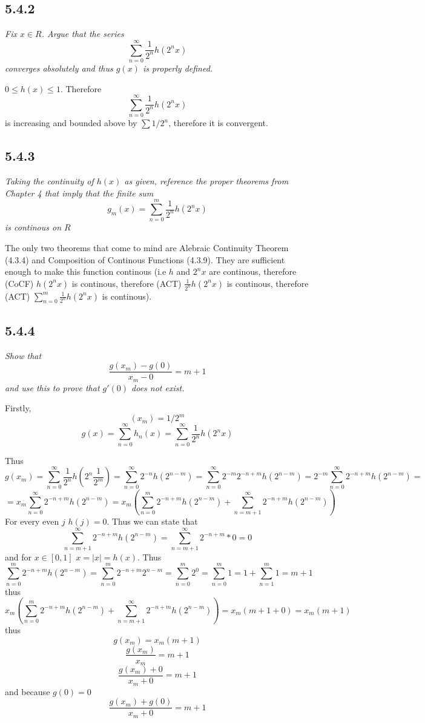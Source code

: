 \documentclass[11pt,oneside,titlepage]{book}
\begin{document}
\subsection*{5.4.2}
\textit{Fix $x \in R$. Argue that the series}
$$\sum_{n = 0}^{\infty}{\frac{1}{2^n}h(2^nx)}$$
\textit{converges absolutely and thus $g(x)$ is properly defined.}

$0 \leq h(x) \leq 1$. Therefore
$$\sum_{n = 0}^{\infty}{\frac{1}{2^n}h(2^nx)}$$
is increasing and bounded above by $\sum{1/2^n}$, therefore it is convergent.

\subsection*{5.4.3}
\textit{Taking the continuity of $h(x)$ as given, reference the proper
  theorems from Chapter 4 that imply that the finite sum}
$$g_m(x) = \sum_{n = 0}^{m}{\frac{1}{2^n} h (2^nx)}$$
\textit{is continous on $R$}

The only two theorems that come to mind are Alebraic Continuity Theorem (4.3.4)
and Composition of Continous Functions (4.3.9).
They are sufficient enough to make this function continous
(i.e $h$ and $2^nx$ are continous, therefore (CoCF) $h(2^nx)$ is continous,
therefore (ACT) $\frac{1}{2^n} h(2^nx)$ is continous, therefore (ACT)
$\sum_{n = 0}^{m} \frac{1}{2^n} h(2^nx)$ is continous).


\subsection*{5.4.4}
\textit{Show that}
$$\frac{g(x_m) - g(0)}{x_m - 0} = m + 1$$
\textit{and use this to prove that $g'(0)$ does not exist.}

Firstly,
$$(x_m) = 1/2^m$$
$$g(x) = \sum_{n = 0}^{\infty}{h_n(x)} =
\sum_{n = 0}^{\infty}{\frac{1}{2^n}h(2^nx)}$$

Thus
$$g(x_m) = \sum_{n = 0}^{\infty}{\frac{1}{2^n}h(2^n \frac{1}{2^m})} = 
\sum_{n = 0}^{\infty}{2^{-n}h(2^{n - m})} =
\sum_{n = 0}^{\infty}{2^{-m}2^{-n + m} h(2^{n - m})} =
2^{-m} \sum_{n = 0}^{\infty}{2^{-n + m} h(2^{n - m})} = $$
$$
= x_m \sum_{n = 0}^{\infty}{2^{-n + m} h(2^{n - m})}
= x_m \left(\sum_{n = 0}^{m}{2^{-n + m} h(2^{n - m})} + 
\sum_{n = m + 1}^{\infty}{2^{-n + m} h(2^{n - m})}\right)
$$
For every even $j$ $h(j) = 0$. Thus we can state that
$$\sum_{n = m + 1}^{\infty}{2^{-n + m} h(2^{n - m})} =
\sum_{n = m + 1}^{\infty}{2^{-n + m} * 0 } = 0
$$
and for $x \in [0, 1]$ $x = |x| = h(x)$. Thus
$$\sum_{n = 0}^{m}{2^{-n + m} h(2^{n - m})} =
\sum_{n = 0}^{m}{2^{-n + m} 2^{n - m}} =
\sum_{n = 0}^{m}{2^0} =
\sum_{n = 0}^{m}{1} =
1 + \sum_{n = 1}^{m}{1} =
m + 1
$$
thus
$$
x_m \left(\sum_{n = 0}^{m}{2^{-n + m} h(2^{n - m})} + 
  \sum_{n = m + 1}^{\infty}{2^{-n + m} h(2^{n - m})}\right) =
x_m \left(m + 1 + 0\right) =
x_m \left(m + 1\right)
$$
thus
$$g(x_m) = x_m(m + 1)$$
$$\frac{g(x_m)}{x_m} = m + 1$$
$$\frac{g(x_m) + 0}{x_m + 0} = m + 1$$
and because $g(0) = 0$
$$\frac{g(x_m) + g(0)}{x_m + 0} = m + 1$$
\end{document}
